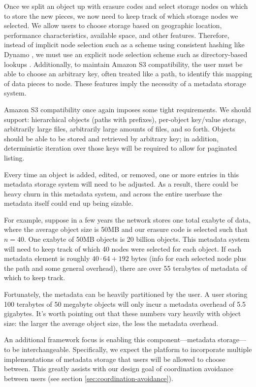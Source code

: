 \documentclass[8pt,fleqn,openany]{book}
\begin{document}
Once we split an object up with erasure codes and select storage nodes on
which to store the new pieces, we now need to keep track of which storage
nodes we selected. We allow users to choose storage based on geographic
location, performance characteristics, available space, and other features.
Therefore, instead of implicit node selection such as a scheme using consistent
hashing like Dynamo \cite{dynamo}, we must use an explicit node selection
scheme such as directory-based lookups \cite{p2p-policies}.
Additionally, to maintain Amazon S3 compatibility, the user must be able to
choose an arbitrary key, often treated like a path, to identify this mapping
of data pieces to node. These features imply the necessity of a metadata
storage system.

Amazon S3 compatibility once again imposes some tight requirements.
We should support:
hierarchical objects (paths with prefixes), per-object key/value storage,
arbitrarily large files, arbitrarily large amounts of files, and so forth.
Objects should be able to be stored and retrieved by arbitrary key; in addition,
deterministic iteration over those keys will be required to allow for
paginated listing.

Every time an
object is added, edited, or removed, one or more entries in this metadata
storage system will need to be adjusted. As a result, there could be heavy churn
in this metadata system, and across the entire userbase the metadata itself
could end up being sizable.

For example, suppose in
a few years the network stores one total exabyte of data, where the average object
size is 50MB and our erasure code is selected such that $n=40$.
One exabyte of 50MB objects is 20 billion objects.
This metadata system will need
to keep track of which 40 nodes were selected for each object.
If each metadata element is roughly $40\cdot 64+192$ bytes (info for each
selected node plus the path and some general overhead), there are over 55
terabytes of metadata of which to keep track.

Fortunately, the metadata can be heavily partitioned by the user. A user storing
100 terabytes of 50 megabyte objects will only incur a metadata overhead of 5.5
gigabytes. It's worth pointing out that these numbers vary
heavily with object size: the larger the average object size, the less the
metadata overhead.

An additional framework focus is enabling this component---metadata
storage---to be interchangeable. Specifically, we expect the platform to incorporate
multiple implementations of metadata storage that users will be allowed to
choose between. This greatly assists with our design goal of coordination
avoidance between users (see section \ref{sec:coordination-avoidance}).
\end{document}
